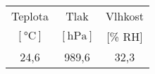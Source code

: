 \begin{tabular}{ccc} 													\toprule
Teplota					&	Tlak					&	Vlhkost		\\
$[\si{\degreeCelsius}]$	&	$[\si{\hecto\pascal}]$ 	&	[\% RH]    	\\ 	\midrule
24,6 					& 	989,6					&	32,3		\\	\bottomrule
\end{tabular}